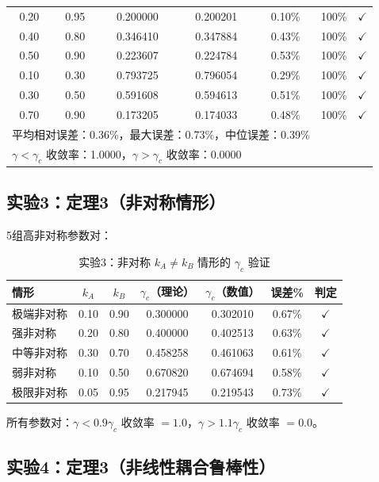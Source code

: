 \documentclass[12pt,a4paper]{article}
\theoremstyle{definition}
\newcommand{\gamc}{\gamma_c}
\begin{document}
\begin{table}[htbp]
\begin{tabular}{ccccccc}
0.20 & 0.95 & 0.200000 & 0.200201 & 0.10\% & 100\% & $\checkmark$ \\
0.40 & 0.80 & 0.346410 & 0.347884 & 0.43\% & 100\% & $\checkmark$ \\
0.50 & 0.90 & 0.223607 & 0.224784 & 0.53\% & 100\% & $\checkmark$ \\
0.10 & 0.30 & 0.793725 & 0.796054 & 0.29\% & 100\% & $\checkmark$ \\
0.30 & 0.50 & 0.591608 & 0.594613 & 0.51\% & 100\% & $\checkmark$ \\
0.70 & 0.90 & 0.173205 & 0.174033 & 0.48\% & 100\% & $\checkmark$ \\
\midrule
\multicolumn{5}{l}{平均相对误差：0.36\%，最大误差：0.73\%，中位误差：0.39\%} \\
\multicolumn{5}{l}{$\gamma < \gamc$ 收敛率：1.0000，$\gamma > \gamc$ 收敛率：0.0000} \\
\bottomrule
\end{tabular}
\end{table}

\subsection{实验3：定理3（非对称情形）}

5组高非对称参数对：

\begin{table}[htbp]
\centering
\caption{实验3：非对称 $k_A \neq k_B$ 情形的 $\gamc$ 验证}
\label{tab:exp3}
\begin{tabular}{lcccccc}
\toprule
情形 & $k_A$ & $k_B$ & $\gamc$（理论） & $\gamc$（数值） & 误差\% & 判定 \\
\midrule
极端非对称 & 0.10 & 0.90 & 0.300000 & 0.302010 & 0.67\% & $\checkmark$ \\
强非对称 & 0.20 & 0.80 & 0.400000 & 0.402513 & 0.63\% & $\checkmark$ \\
中等非对称 & 0.30 & 0.70 & 0.458258 & 0.461063 & 0.61\% & $\checkmark$ \\
弱非对称 & 0.10 & 0.50 & 0.670820 & 0.674694 & 0.58\% & $\checkmark$ \\
极限非对称 & 0.05 & 0.95 & 0.217945 & 0.219543 & 0.73\% & $\checkmark$ \\
\bottomrule
\end{tabular}
\end{table}

所有参数对：$\gamma < 0.9\gamc$ 收敛率 $= 1.0$，$\gamma > 1.1\gamc$ 收敛率 $= 0.0$。

\subsection{实验4：定理3（非线性耦合鲁棒性）}
\end{document}
